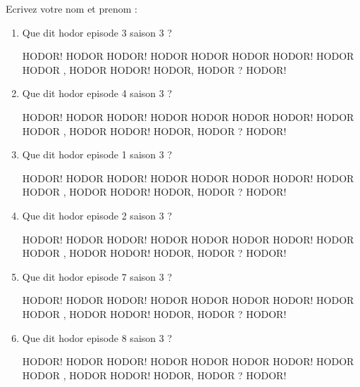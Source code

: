 \documentclass[a4paper, 11pt]{article}
\begin{document}
	Ecrivez votre nom et prenom :
	\begin{qcm}
		\begin{enumerate}
			\item Que dit hodor episode 3 saison 3 ?
			\begin{tabenum} [1)]
				\tabenumitem HODOR!
				\tabenumitem HODOR HODOR!
				\tabenumitem HODOR HODOR HODOR HODOR!
				\tabenumitem HODOR HODOR , HODOR HODOR!
				\tabenumitem HODOR, HODOR ? HODOR!
			\end{tabenum}
		\vspace{5mm}

			\item Que dit hodor episode 4 saison 3 ?
			\begin{tabenum} [1)]
				\tabenumitem HODOR!
				\tabenumitem HODOR HODOR!
				\tabenumitem HODOR HODOR HODOR HODOR!
				\tabenumitem HODOR HODOR , HODOR HODOR!
				\tabenumitem HODOR, HODOR ? HODOR!
			\end{tabenum}
		\vspace{5mm}

			\item Que dit hodor episode 1 saison 3 ?
			\begin{tabenum} [1)]
				\tabenumitem HODOR!
				\tabenumitem HODOR HODOR!
				\tabenumitem HODOR HODOR HODOR HODOR!
				\tabenumitem HODOR HODOR , HODOR HODOR!
				\tabenumitem HODOR, HODOR ? HODOR!
			\end{tabenum}
		\vspace{5mm}

			\item Que dit hodor episode 2 saison 3 ?
			\begin{tabenum} [1)]
				\tabenumitem HODOR!
				\tabenumitem HODOR HODOR!
				\tabenumitem HODOR HODOR HODOR HODOR!
				\tabenumitem HODOR HODOR , HODOR HODOR!
				\tabenumitem HODOR, HODOR ? HODOR!
			\end{tabenum}
		\vspace{5mm}

			\item Que dit hodor episode 7 saison 3 ?
			\begin{tabenum} [1)]
				\tabenumitem HODOR!
				\tabenumitem HODOR HODOR!
				\tabenumitem HODOR HODOR HODOR HODOR!
				\tabenumitem HODOR HODOR , HODOR HODOR!
				\tabenumitem HODOR, HODOR ? HODOR!
			\end{tabenum}
		\vspace{5mm}

			\item Que dit hodor episode 8 saison 3 ?
			\begin{tabenum} [1)]
				\tabenumitem HODOR!
				\tabenumitem HODOR HODOR!
				\tabenumitem HODOR HODOR HODOR HODOR!
				\tabenumitem HODOR HODOR , HODOR HODOR!
				\tabenumitem HODOR, HODOR ? HODOR!
			\end{tabenum}
		\vspace{5mm}


\end{enumerate}
\end{qcm}
\end{document}
